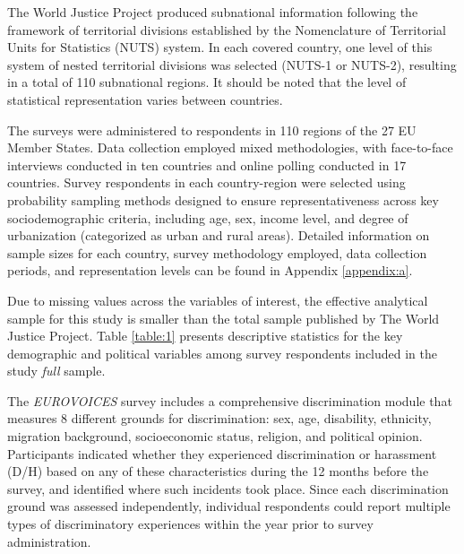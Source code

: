 \documentclass{article}
\begin{document}
The World Justice Project produced subnational information following the framework of territorial divisions established by the Nomenclature of Territorial Units for Statistics (NUTS) system. In each covered country, one level of this system of nested territorial divisions was selected (NUTS-1 or NUTS-2), resulting in a total of 110 subnational regions. It should be noted that the level of statistical representation varies between countries.

The surveys were administered to respondents in 110 regions of the 27 EU Member States. Data collection employed mixed methodologies, with face-to-face interviews conducted in ten countries and online polling conducted in 17 countries. Survey respondents in each country-region were selected using probability sampling methods designed to ensure representativeness across key sociodemographic criteria, including age, sex, income level, and degree of urbanization (categorized as urban and rural areas). Detailed information on sample sizes for each country, survey methodology employed, data collection periods, and representation levels can be found in Appendix \ref{appendix:a}.

Due to missing values across the variables of interest, the effective analytical sample for this study is smaller than the total sample published by The World Justice Project. Table \ref{table:1} presents descriptive statistics for the key demographic and political variables among survey respondents included in the study \emph{full} sample.



The \emph{EUROVOICES} survey includes a comprehensive discrimination module that measures 8 different grounds for discrimination: sex, age, disability, ethnicity, migration background, socioeconomic status, religion, and political opinion. Participants indicated whether they experienced discrimination or harassment (D/H) based on any of these characteristics during the 12 months before the survey, and identified where such incidents took place. Since each discrimination ground was assessed independently, individual respondents could report multiple types of discriminatory experiences within the year prior to survey administration.
\end{document}
